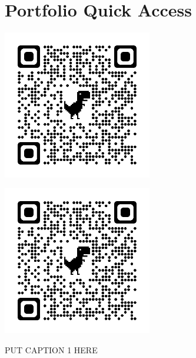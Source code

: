 \documentclass[a4paper,10pt]{article}
\begin{document}
\section{Portfolio Quick Access}
\vspace{20pt}
  \begin{center}
    \begin{minipage}{0.45\textwidth}
        \centering
        \includegraphics[width=6.5cm, height=6.5cm]{Figures/Apple.png}
        \label{fig:image1}
    \end{minipage}
    \hspace{0.05\textwidth}
    \begin{minipage}{0.45\textwidth}
        \centering
        \includegraphics[width=6.5cm, height=6.5cm]{Figures/Apple.png}
        \label{fig:image2}
    \end{minipage}
    PUT CAPTION 1 HERE
    \vspace{0.5cm} %


\end{center}
\end{document}
